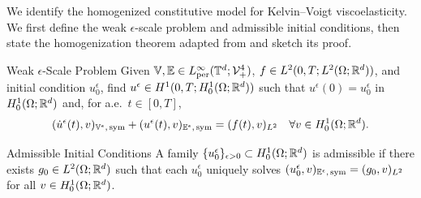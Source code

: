 \documentclass[3p, 12pt, preprint]{elsarticle}
\begin{document}
We identify the homogenized constitutive model for Kelvin--Voigt viscoelasticity. We first define the weak $\epsilon$-scale problem and admissible initial conditions, then state the homogenization theorem adapted from \cite{francfort1986homogenization} and sketch its proof.

\begin{namedparagraph}{Weak $\epsilon$-Scale Problem} Given $\mathbb{V},\mathbb{E}\in L^{\infty}_{\mathrm{per}}(\mathbb{T}^d;{\mathcal{V}}^4_{+})$, $f \in L^2(0,T; L^2(\Omega; \mathbb{R}^d))$, and initial condition $u_0^\epsilon$, find $u^{\epsilon} \in H^1(0,T; H^1_0(\Omega;\mathbb{R}^d))$ such that $u^{\epsilon}(0)=u_0^\epsilon$ in $H_0^1(\Omega;\mathbb{R}^d)$ and, for a.e.\ $t\in [0,T]$,
\begin{equation}\label{eq:two_scale_weak_form}
    (\dot{u}^{\epsilon}(t), v)_{\mathbb{V}^{\epsilon},\, \mathrm{sym}} + (u^{\epsilon}(t), v)_{\mathbb{E}^{\epsilon},\,\mathrm{sym}} = (f(t), v)_{L^2}\quad \forall v\in H^1_0(\Omega;\mathbb{R}^d).
\end{equation}
\end{namedparagraph}

\begin{namedparagraph}{Admissible Initial Conditions}
A family $\{u_0^\epsilon\}_{\epsilon>0}\subset H_0^1(\Omega;\mathbb{R}^d)$ is admissible if there exists $g_0\in L^2(\Omega;\mathbb{R}^d)$ such that each $u_0^\epsilon$ uniquely solves $(u_0^\epsilon ,v)_{\mathbb{E}^{\epsilon},\, \mathrm{sym}} =(g_0, v)_{L^2}$ for all $v\in H_0^1(\Omega;\mathbb{R}^d)$.
\end{namedparagraph}

\end{document}
